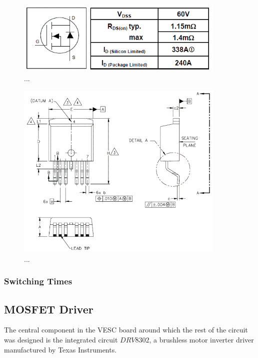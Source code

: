 \begin{figure}[htbp]
\centering
\includegraphics[width=10cm]{Images/irf.png} 
\caption[IRF 1]{...}
\label{fig:irf}
\end{figure}

\begin{figure}[htbp]
\centering
\includegraphics[width=10cm]{Images/irf_2.png} 
\caption[IRF 2]{...}
\label{fig:irf_2}
\end{figure}

\subsubsection{Switching Times}



\subsection{MOSFET Driver}

The central component in the VESC board around which the rest of the circuit was designed is the integrated circuit $DRV8302$, a brushless motor inverter driver manufactured by Texas Instruments.


